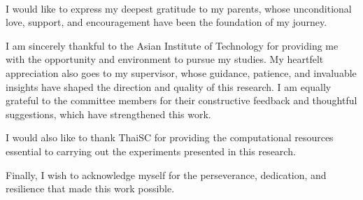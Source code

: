 
\setlength{\parindent}{0pt}
\setlength{\parskip}{1em}
\setlength{\baselineskip}{1.5em} %

\begin{center}
  \fontsize{14}{17} \\
\end{center}
\vspace{36pt} 
I would like to express my deepest gratitude to my parents, whose unconditional love, support, and encouragement have been the foundation of my journey.

I am sincerely thankful to the Asian Institute of Technology for providing me with the opportunity and environment to pursue my studies.
My heartfelt appreciation also goes to my supervisor, whose guidance, patience, and invaluable insights have shaped the direction and quality of this research.
I am equally grateful to the committee members for their constructive feedback and thoughtful suggestions, which have strengthened this work.

I would also like to thank ThaiSC for providing the computational resources essential to carrying out the experiments presented in this research.

Finally, I wish to acknowledge myself for the perseverance, dedication, and resilience that made this work possible.
